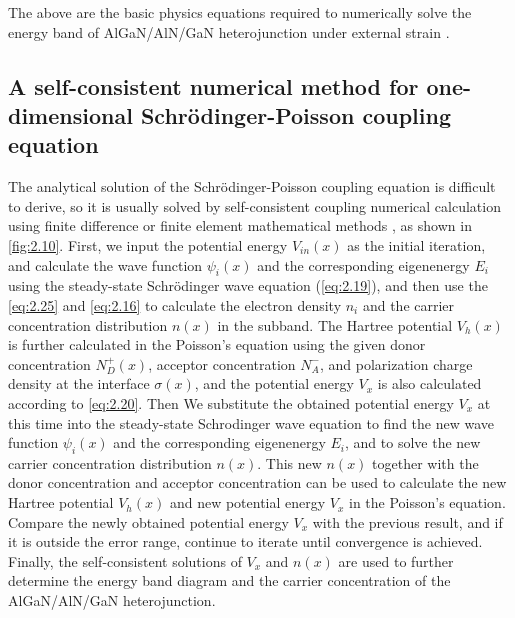 The above are the basic physics equations required to numerically solve the energy band  of AlGaN/AlN/GaN heterojunction  under external  strain \cite{morkoc2008polarization,lenka2011self,lenka20142deg,jiang2018thesis}.



\subsection{A self-consistent numerical method for one-dimensional Schrödinger-Poisson coupling equation}
\label{sec:A self-consistent numerical method for one-dimensional Schrodinger-Poisson coupling equation}

The analytical solution of the Schrödinger-Poisson coupling equation  is difficult to derive, so it is usually solved by self-consistent  coupling numerical calculation using finite difference or finite element mathematical methods \cite{lenka2011self,lenka20142deg}, as shown in \autoref{fig:2.10}. First, we input the potential energy  $V_{in}(x)$ as the initial iteration, and calculate the wave function $\psi_{i}(x)$ and the corresponding eigenenergy $E_{i}$ using the steady-state Schrödinger wave equation (\autoref{eq:2.19}), and then use the \autoref{eq:2.25} and \autoref{eq:2.16} to calculate the electron density $n_{i}$ and the carrier concentration distribution  $n(x)$ in the subband. The Hartree potential  $V_{h}(x)$ is further calculated in the Poisson's equation  using the given donor concentration $N^{+}_{D}(x)$, acceptor concentration $N_{A}^{-}$, and polarization charge density  at the  interface $\sigma(x)$, and the potential  energy $V_{x}$ is also calculated according to \autoref{eq:2.20}. Then We substitute the obtained potential energy $V_{x}$ at this time into the steady-state Schrodinger wave equation to find the new wave function $\psi_{i}(x)$ and the corresponding eigenenergy $E_{i}$, and to solve the new carrier concentration distribution $n(x)$. This new $n(x)$ together with the donor concentration and acceptor concentration can be used to calculate the new Hartree potential  $V_{h}(x)$ and new potential energy  $V_{x}$ in the  Poisson's equation. Compare the newly obtained potential energy $V_{x}$ with the previous result, and if it is outside the error range, continue to iterate until convergence is achieved. Finally, the self-consistent solutions of $V_{x}$ and $n(x)$ are used to further determine the  energy band diagram and the carrier concentration  of the  AlGaN/AlN/GaN heterojunction.

